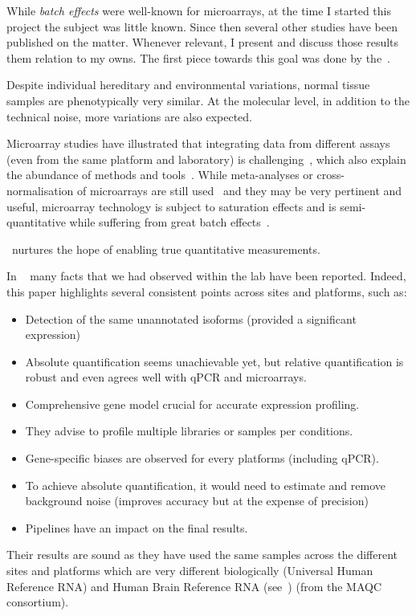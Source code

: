 While \emph{batch effects} were well-known for microarrays,
at the time I started this project
the subject was little known.
Since then several other studies have been published on the matter.
Whenever relevant, I present and discuss those results them relation to my owns.
The first piece towards this goal was done by the~.


Despite individual hereditary and environmental variations,
normal tissue samples are phenotypically very similar.
At the molecular level, in addition to the technical noise,
more variations are also expected.

Microarray studies have illustrated that integrating data
from different assays (even from the same platform and laboratory)
is challenging~,
which also explain the abundance of methods and tools~.
While meta-analyses or cross-normalisation of microarrays are still
used~ and they may be very pertinent and
useful,
microarray technology is subject to saturation effects and is semi-quantitative
while suffering from great batch effects~.

\Rnaseq\ nurtures the hope of enabling true quantitative measurements.


In ~ many facts that
we had observed within the lab have been reported.
Indeed, this paper highlights several consistent points
across sites and platforms,
such as:
\begin{itemize}[topsep=0pt,nolistsep,noitemsep]
        \setlength{\itemsep}{1pt}
        \setlength{\parskip}{0pt}
        \setlength{\parsep}{0pt}
    \item Detection of the same unannotated isoforms (provided a significant expression)
    \item Absolute quantification seems unachievable yet,
        but relative quantification is robust and even agrees well with \gls{qPCR}
        and microarrays.
    \item Comprehensive gene model crucial for accurate expression profiling.
    \item They advise to profile multiple libraries or samples per conditions.
    \item Gene-specific biases are observed for every platforms
        (including \gls{qPCR}).
    \item To achieve absolute quantification, it would need to estimate and
        remove background noise (improves accuracy but at the expense of precision)
    \item Pipelines have an impact on the final results.
\end{itemize}

Their results are sound as they have used the same samples across the different
sites and platforms which are very different biologically (Universal
Human Reference RNA) and Human Brain Reference RNA
(see~) (from the \gls{MAQC} consortium).


